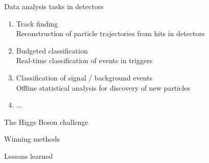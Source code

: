 \documentclass{beamer}
\begin{document}

\begin{frame}{Data analysis tasks in detectors}
\begin{enumerate}

\item Track finding\\
    {\scriptsize Reconstruction of particle trajectories from hits in detectors}

    \vspace{0.5cm}

\item Budgeted classification\\
    {\scriptsize Real-time classification of events in triggers}

    \vspace{0.5cm}

\item Classification of signal / background events\\
    {\scriptsize Offline statistical analysis for discovery of new particles}

    \vspace{0.5cm}

\item ...

\end{enumerate}
\end{frame}


\begin{frame}{The Higgs Boson challenge}
\end{frame}

\begin{frame}{Winning methods}

\end{frame}

\begin{frame}{Lessons learned}

\end{frame}
\end{document}
